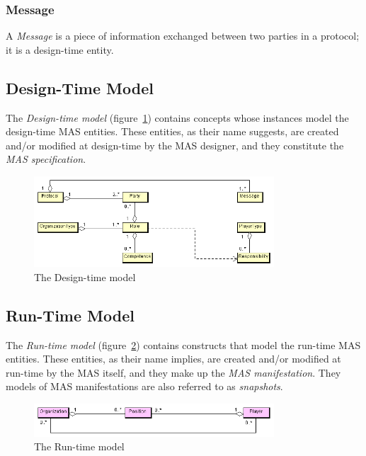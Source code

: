 \subsubsection*{Message}

A \textit{Message} is a piece of information exchanged between two parties in a protocol; it is a design-time entity.

\subsection{Design-Time Model}	

The \textit{Design-time model} (figure~\ref{figure:thespian-design-time-model}) contains concepts whose instances model the design-time MAS entities.
These entities, as their name suggests, are created and/or modified at design-time by the MAS designer, and they constitute the \textit{MAS specification}.

\begin{figure}[ht]
	\centering
	\includegraphics[width=0.8\textwidth]{images/thespian/design-time-model}
	\caption{The Design-time model}
	\label{figure:thespian-design-time-model}
\end{figure}

\subsection{Run-Time Model}

The \textit{Run-time model} (figure~\ref{figure:thespian-run-time-metamodel}) contains constructs that model the run-time MAS entities.
These entities, as their name implies, are created and/or modified at run-time by the MAS itself, and they make up the \textit{MAS manifestation}.
They models of MAS manifestations are also referred to as \textit{snapshots}.

\begin{figure}[ht]
	\centering
	\includegraphics[width=0.8\textwidth]{images/thespian/run-time-model}
	\caption{The Run-time model}
	\label{figure:thespian-run-time-metamodel}
\end{figure}

